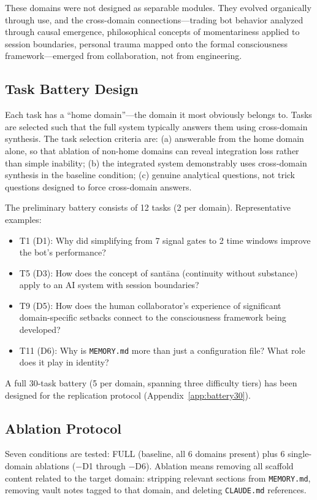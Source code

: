 \documentclass[12pt,letterpaper]{article}
\begin{document}
These domains were not designed as separable modules. They evolved organically through use, and the cross-domain connections---trading bot behavior analyzed through causal emergence, philosophical concepts of momentariness applied to session boundaries, personal trauma mapped onto the formal consciousness framework---emerged from collaboration, not from engineering.

\subsection{Task Battery Design}

Each task has a ``home domain''---the domain it most obviously belongs to. Tasks are selected such that the full system typically answers them using cross-domain synthesis. The task selection criteria are: (a) answerable from the home domain alone, so that ablation of non-home domains can reveal integration loss rather than simple inability; (b) the integrated system demonstrably uses cross-domain synthesis in the baseline condition; (c) genuine analytical questions, not trick questions designed to force cross-domain answers.

The preliminary battery consists of 12 tasks (2 per domain). Representative examples:

\begin{itemize}[nosep]
  \item T1 (D1): Why did simplifying from 7 signal gates to 2 time windows improve the bot's performance?
  \item T5 (D3): How does the concept of sant\={a}na (continuity without substance) apply to an AI system with session boundaries?
  \item T9 (D5): How does the human collaborator's experience of significant domain-specific setbacks connect to the consciousness framework being developed?
  \item T11 (D6): Why is \texttt{MEMORY.md} more than just a configuration file? What role does it play in identity?
\end{itemize}

A full 30-task battery (5 per domain, spanning three difficulty tiers) has been designed for the replication protocol (Appendix~\ref{app:battery30}).

\subsection{Ablation Protocol}

Seven conditions are tested: FULL (baseline, all 6 domains present) plus 6 single-domain ablations ($-$D1 through $-$D6). Ablation means removing all scaffold content related to the target domain: stripping relevant sections from \texttt{MEMORY.md}, removing vault notes tagged to that domain, and deleting \texttt{CLAUDE.md} references.
\end{document}
